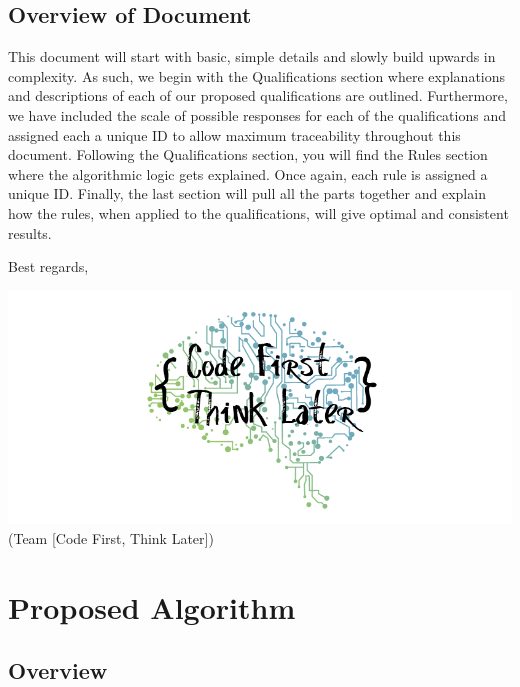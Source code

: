 \documentclass[12pt,letterpaper]{article}
\begin{document}
\subsection{Overview of Document}

This document will start with basic, simple details and slowly build upwards in complexity. As such, we begin with the Qualifications section where explanations and descriptions of each of our proposed qualifications are outlined. Furthermore, we have included the scale of possible responses for each of the qualifications and assigned each a unique ID to allow maximum traceability throughout this document. Following the Qualifications section, you will find the Rules section where the algorithmic logic gets explained. Once again, each rule is assigned a unique ID. Finally, the last section will pull all the parts together and explain how the rules, when applied to the qualifications, will give optimal and consistent results.

\vspace{1em}

\noindent Best regards,

\vspace{1em}

\begin{center}
	\includegraphics[scale=0.4]{imgs/logo.png} \\ \footnotesize{(Team [Code First, Think Later])}
\end{center}

\vspace{1em}

\section{Proposed Algorithm}

\subsection{Overview}
\end{document}

